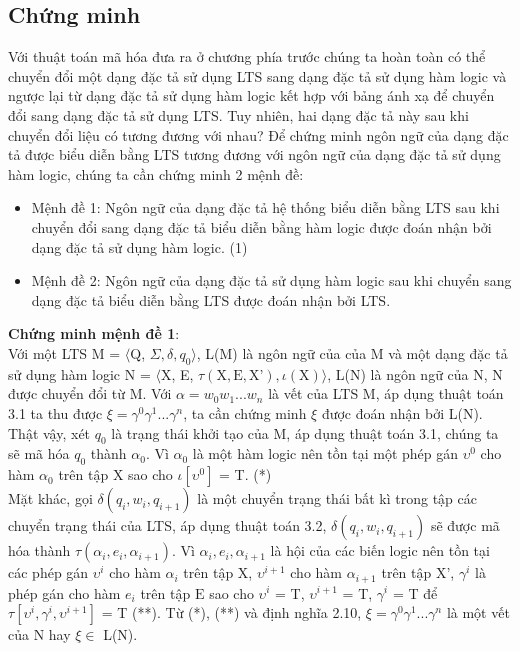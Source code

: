 \documentclass[a4paper,13pt,oneside,openany]{book}
\begin{document}
\begin{flushleft}
		\section{Chứng minh}
		Với thuật toán mã hóa đưa ra ở chương phía trước chúng ta hoàn toàn có thể chuyển đổi một dạng đặc tả sử dụng LTS sang dạng đặc tả sử dụng hàm logic và ngược lại từ dạng đặc tả sử dụng hàm logic kết hợp với bảng ánh xạ để chuyển đổi sang dạng đặc tả sử dụng LTS. Tuy nhiên, hai dạng đặc tả này sau khi chuyển đổi liệu có tương đương với nhau?
		Để chứng minh ngôn ngữ của dạng đặc tả được biểu diễn bằng LTS tương đương với ngôn ngữ của dạng đặc tả sử dụng hàm logic, chúng ta cần chứng minh 2 mệnh đề:
		\begin{itemize}
			\item Mệnh đề 1: Ngôn ngữ của dạng đặc tả hệ thống biểu diễn bằng LTS sau khi chuyển đổi sang dạng đặc tả biểu diễn bằng hàm logic được đoán nhận bởi dạng đặc tả sử dụng hàm logic. (1)\\
			\item Mệnh đề 2: Ngôn ngữ của dạng đặc tả sử dụng hàm logic sau khi chuyển sang dạng đặc tả biểu diễn bằng LTS được đoán nhận bởi LTS.
		\end{itemize}
		\textbf{Chứng minh mệnh đề 1}:\\
		Với một LTS M = $\langle$Q, $\Sigma, \delta, q_0 \rangle$, L(M) là ngôn ngữ của của M và một dạng đặc tả sử dụng hàm logic N = $\langle$X, E, $\tau(\textrm{X}, \textrm{E}, \textrm{X'}), \iota(\textrm{X})\rangle$, L(N) là ngôn ngữ của N, N được chuyển đổi từ M.
		Với $\alpha = w_0w_1...w_n$ là vết của LTS M, áp dụng thuật toán 3.1 ta thu được $\xi = \gamma^0\gamma^1...\gamma^n$, ta cần chứng minh $\xi$ được đoán nhận bởi L(N). Thật vậy, xét $q_0$ là trạng thái khởi tạo của M, áp dụng thuật toán 3.1, chúng ta sẽ mã hóa $q_0$ thành $\alpha_0$. Vì $\alpha_0$ là một hàm logic nên tồn tại một phép gán $\upsilon^0$ cho hàm $\alpha_0$ trên tập X sao cho $\iota[\upsilon^0]$ = T. (*)\\
		Mặt khác, gọi $\delta(q_i, w_i, q_{i+1})$ là một chuyển trạng thái bất kì trong tập các chuyển trạng thái của LTS, áp dụng thuật toán 3.2, $\delta(q_i, w_i, q_{i+1})$ sẽ được mã hóa thành $\tau(\alpha_i, e_i,  \alpha_{i+1})$. Vì $\alpha_i, e_i, \alpha_{i+1}$ là hội của các biến logic nên tồn tại các phép gán $\upsilon^i$ cho hàm $\alpha_i$ trên tập $\textrm{X}$, $\upsilon^{i+1}$ cho hàm $\alpha_{i+1}$ trên tập $\textrm{X'}$, $\gamma^i$ là phép gán cho hàm $e_i$ trên tập $\textrm{E}$ sao cho $\upsilon^i$ = T, $\upsilon^{i+1}$ = T, $\gamma^i$ = T để $\tau[\upsilon^i, \gamma^i, \upsilon^{i+1}]$ = T (**). Từ (*), (**) và định nghĩa 2.10, $\xi = \gamma^0\gamma^1...\gamma^n$ là một vết của N hay $\xi \in$ L(N).\\

\end{flushleft}
\end{document}
